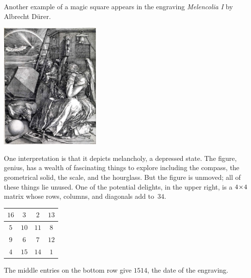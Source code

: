 Another example of a magic square appears in the engraving
\textit{Melencolia I} by Albrecht D\"urer.
\begin{center}
  \includegraphics[height=2.5in]{Melencolia.jpg} %
\end{center}
One interpretation is that it depicts melancholy, a depressed state.
The figure, genius,
has a wealth of fascinating things to explore including
the compass, the geometrical solid, the scale, and the hourglass.
But the figure is unmoved; all of these things lie unused.
One of the potential delights, in the upper right,
is a $4 \! \times \! 4$ matrix whose
rows, columns, and diagonals add to~$34$.
\begin{center}
  \hspace{1in}
  \begin{tabular}{|c|c|c|c|}
    \hline
      $16$  &$3$  &$2$  &$13$  \\ \hline
      $5$   &$10$ &$11$ &$8$   \\ \hline
      $9$   &$6$  &$7$  &$12$  \\ \hline    
      $4$   &$15$ &$14$ &$1$  \\ \hline  
  \end{tabular}
\end{center}
The middle entries on the bottom row give $1514$, the 
date of the engraving.

